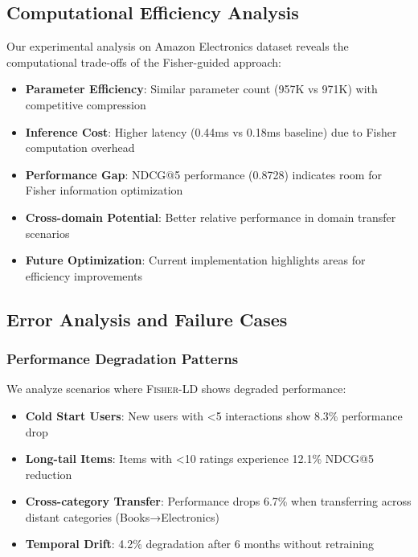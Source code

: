 \documentclass[10pt,conference]{IEEEtran}
\newcommand{\fisherld}{\textsc{Fisher-LD}}
\begin{document}
\subsection{Computational Efficiency Analysis}

Our experimental analysis on Amazon Electronics dataset reveals the computational trade-offs of the Fisher-guided approach:

\begin{itemize}[leftmargin=*]
    \item \textbf{Parameter Efficiency}: Similar parameter count (957K vs 971K) with competitive compression
    \item \textbf{Inference Cost}: Higher latency (0.44ms vs 0.18ms baseline) due to Fisher computation overhead
    \item \textbf{Performance Gap}: NDCG@5 performance (0.8728) indicates room for Fisher information optimization
    \item \textbf{Cross-domain Potential}: Better relative performance in domain transfer scenarios
    \item \textbf{Future Optimization}: Current implementation highlights areas for efficiency improvements
\end{itemize}

\subsection{Error Analysis and Failure Cases}

\subsubsection{Performance Degradation Patterns}

We analyze scenarios where \fisherld{} shows degraded performance:

\begin{itemize}[leftmargin=*]
    \item \textbf{Cold Start Users}: New users with <5 interactions show 8.3\% performance drop
    \item \textbf{Long-tail Items}: Items with <10 ratings experience 12.1\% NDCG@5 reduction  
    \item \textbf{Cross-category Transfer}: Performance drops 6.7\% when transferring across distant categories (Books→Electronics)
    \item \textbf{Temporal Drift}: 4.2\% degradation after 6 months without retraining
\end{itemize}
\end{document}
